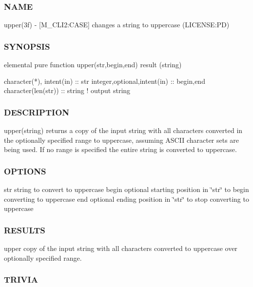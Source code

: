 \subsubsection*{N\+A\+ME}

upper(3f) -\/ \mbox{[}M\+\_\+\+C\+L\+I2\+:C\+A\+SE\mbox{]} changes a string to uppercase (L\+I\+C\+E\+N\+SE\+:PD) 

\subsubsection*{S\+Y\+N\+O\+P\+S\+IS}

\begin{DoxyVerb}elemental pure function upper(str,begin,end) result (string)

 character(*), intent(in)    :: str
 integer,optional,intent(in) :: begin,end
 character(len(str))         :: string  ! output string
\end{DoxyVerb}
 \subsubsection*{D\+E\+S\+C\+R\+I\+P\+T\+I\+ON}

upper(string) returns a copy of the input string with all characters converted in the optionally specified range to uppercase, assuming A\+S\+C\+II character sets are being used. If no range is specified the entire string is converted to uppercase.

\subsubsection*{O\+P\+T\+I\+O\+NS}

str string to convert to uppercase begin optional starting position in \char`\"{}str\char`\"{} to begin converting to uppercase end optional ending position in \char`\"{}str\char`\"{} to stop converting to uppercase

\subsubsection*{R\+E\+S\+U\+L\+TS}

upper copy of the input string with all characters converted to uppercase over optionally specified range.

\subsubsection*{T\+R\+I\+V\+IA}

